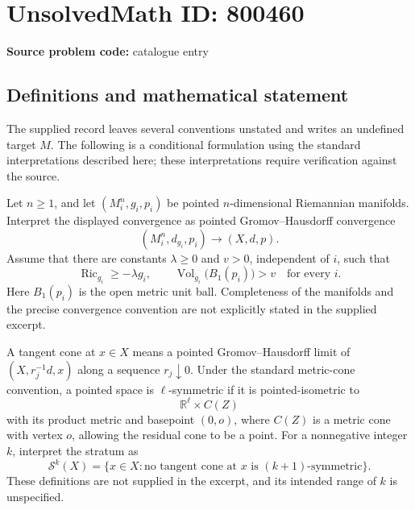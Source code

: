 \documentclass[11pt]{article}
\newcommand{\R}{\mathbb{R}}
\begin{document}
\section*{UnsolvedMath ID: 800460}
\textbf{Source problem code:} catalogue entry
\subsection{Definitions and mathematical statement}
The supplied record leaves several conventions unstated and writes an undefined target \(M\). The following is a conditional formulation using the standard interpretations described here; these interpretations require verification against the source.

Let \(n\geq 1\), and let \((M_i^n,g_i,p_i)\) be pointed \(n\)-dimensional Riemannian manifolds. Interpret the displayed convergence as pointed Gromov--Hausdorff convergence
\[
(M_i^n,d_{g_i},p_i)\longrightarrow (X,d,p).
\]
Assume that there are constants \(\lambda\geq 0\) and \(v>0\), independent of \(i\), such that
\[
\operatorname{Ric}_{g_i}\geq -\lambda g_i,
\qquad
\operatorname{Vol}_{g_i}\bigl(B_1(p_i)\bigr)>v
\quad\text{for every }i.
\]
Here \(B_1(p_i)\) is the open metric unit ball. Completeness of the manifolds and the precise convergence convention are not explicitly stated in the supplied excerpt.

A tangent cone at \(x\in X\) means a pointed Gromov--Hausdorff limit of \((X,r_j^{-1}d,x)\) along a sequence \(r_j\downarrow 0\). Under the standard metric-cone convention, a pointed space is \(\ell\)-symmetric if it is pointed-isometric to
\[
\R^\ell\times C(Z)
\]
with its product metric and basepoint \((0,o)\), where \(C(Z)\) is a metric cone with vertex \(o\), allowing the residual cone to be a point. For a nonnegative integer \(k\), interpret the stratum as
\[
\mathcal S^k(X)
=
\{x\in X: \text{no tangent cone at }x\text{ is }(k+1)\text{-symmetric}\}.
\]
These definitions are not supplied in the excerpt, and its intended range of \(k\) is unspecified.
\end{document}
